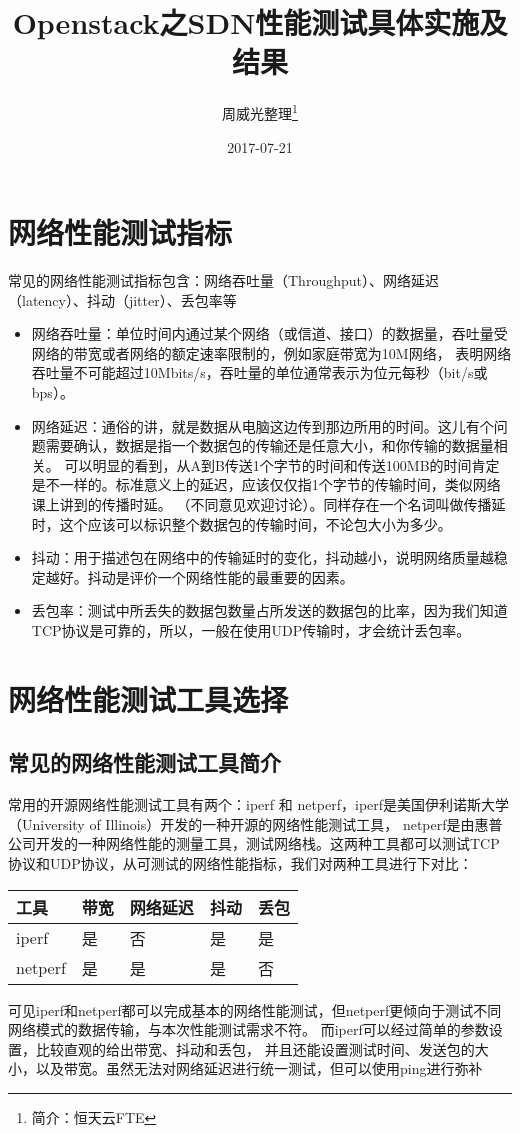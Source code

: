\documentclass[a4paper,left=1.5cm,right=1.5cm,11pt]{article}
\title{Openstack之SDN性能测试具体实施及结果}
\author{周威光整理\footnote{简介：恒天云FTE}}
\date{2017-07-21}
\begin{document}
\maketitle
\clearpage
\tableofcontents
\clearpage
\section{网络性能测试指标}
常见的网络性能测试指标包含：网络吞吐量（Throughput）、网络延迟（latency）、抖动（jitter）、丢包率等
\begin{itemize}
	\item[1.]网络吞吐量：单位时间内通过某个网络（或信道、接口）的数据量，吞吐量受网络的带宽或者网络的额定速率限制的，例如家庭带宽为10M网络，
	表明网络吞吐量不可能超过10Mbits/s，吞吐量的单位通常表示为位元每秒（bit/s或bps）。
	\item[2.]网络延迟：通俗的讲，就是数据从电脑这边传到那边所用的时间。这儿有个问题需要确认，数据是指一个数据包的传输还是任意大小，和你传输的数据量相关。
	可以明显的看到，从A到B传送1个字节的时间和传送100MB的时间肯定是不一样的。标准意义上的延迟，应该仅仅指1个字节的传输时间，类似网络课上讲到的传播时延。
	（不同意见欢迎讨论）。同样存在一个名词叫做传播延时，这个应该可以标识整个数据包的传输时间，不论包大小为多少。
	\item[3.]抖动：用于描述包在网络中的传输延时的变化，抖动越小，说明网络质量越稳定越好。抖动是评价一个网络性能的最重要的因素。
	\item[4.]丢包率：测试中所丢失的数据包数量占所发送的数据包的比率，因为我们知道TCP协议是可靠的，所以，一般在使用UDP传输时，才会统计丢包率。
\end{itemize}
\section{网络性能测试工具选择}
\subsection{常见的网络性能测试工具简介}
常用的开源网络性能测试工具有两个：iperf 和 netperf，iperf是美国伊利诺斯大学（University of Illinois）开发的一种开源的网络性能测试工具，
netperf是由惠普公司开发的一种网络性能的测量工具，测试网络栈。这两种工具都可以测试TCP协议和UDP协议，从可测试的网络性能指标，我们对两种工具进行下对比：
\begin{center}
\begin{tabular}[c]{|l|l|l|l|l|}
\hline
工具 & 带宽 & 网络延迟 & 抖动 & 丢包 \\
\hline
iperf & 是 & 否 & 是 & 是 \\
\hline
netperf & 是 & 是 & 是 & 否 \\
\hline
\end{tabular}
\end{center}\par
可见iperf和netperf都可以完成基本的网络性能测试，但netperf更倾向于测试不同网络模式的数据传输，与本次性能测试需求不符。
而iperf可以经过简单的参数设置，比较直观的给出带宽、抖动和丢包，
并且还能设置测试时间、发送包的大小，以及带宽。虽然无法对网络延迟进行统一测试，但可以使用ping进行弥补
\end{document}
